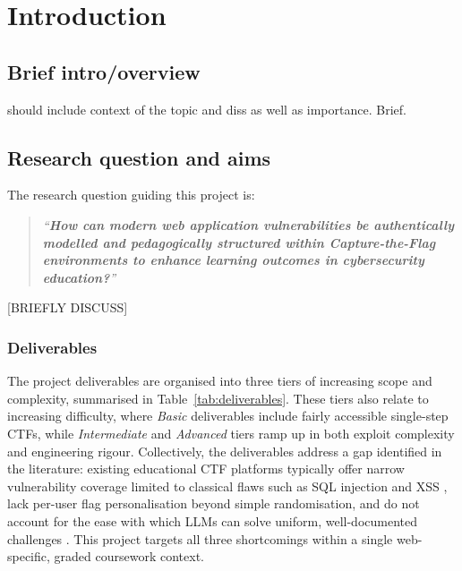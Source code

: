 
\ifCLASSOPTIONcompsoc
{}
\else
\section{Introduction}
\label{sec:introduction}
\fi





\subsection{Brief intro/overview}
 should include context of the topic and diss as well as importance. Brief.


\subsection{Research question and aims}

The research question guiding this project is:
\begin{quote}
\textit{``\textbf{How can modern web application vulnerabilities be authentically
modelled and pedagogically structured within Capture-the-Flag
environments to enhance learning outcomes in cybersecurity education?}''}
\end{quote}
[BRIEFLY DISCUSS]

\subsubsection{Deliverables}
The project deliverables are organised into three tiers of increasing
scope and complexity, summarised in Table~\ref{tab:deliverables}.
These tiers also relate to increasing difficulty, where \textit{Basic}
deliverables include fairly accessible single-step CTFs, while
\textit{Intermediate} and \textit{Advanced} tiers ramp up in both
exploit complexity and engineering rigour. Collectively, the
deliverables address a gap identified in the literature: existing
educational CTF platforms typically offer narrow vulnerability coverage
limited to classical flaws such as SQL injection and XSS
\cite{Sasiwanit}, lack per-user flag personalisation beyond simple
randomisation, and do not account for the ease with
which LLMs can solve uniform, well-documented challenges
\cite{ji2025}. This project targets all three shortcomings within a
single web-specific, graded coursework context.


